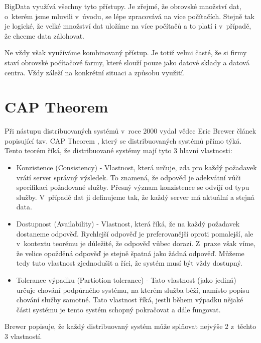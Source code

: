 BigData využívá všechny tyto přístupy. Je zřejmé, že obrovské množství dat, o~kterém jsme mluvili v~úvodu, se lépe zpracovává na více počítačích. Stejně tak je logické, že velké množství dat uložíme na více počítačů a to platí i v~případě, že chceme data zálohovat. 

Ne vždy však využíváme kombinovaný přístup. Je totiž velmi časté, že si firmy staví obrovské počítačové farmy, které slouží pouze jako datové sklady a datová centra. Vždy záleží na konkrétní situaci a způsobu využití. 


\section{CAP Theorem}
 Při nástupu distribuovaných systémů v~roce 2000 vydal vědec Eric Brewer článek popisující tzv. CAP Theorem \cite{cap}, který se distribuovaných systémů přímo týká. Tento teorém říká, že distribuované systémy mají tyto 3 hlavní vlastnosti: 

\begin{itemize}
\item Konzistence (Consistency) - Vlastnost, která určuje, zda pro každý požadavek vrátí server správný výsledek. To znamená, že odpověď je adekvátní vůči specifikaci požadované služby. Přesný význam konzistence se odvíjí od typu služby. V~případě dat ji definujeme tak, že každý server má aktuální a stejná data.

\item Dostupnost (Availability) - Vlastnost, která říká, že na každý požadavek dostaneme odpověď. Rychlejší odpověď je preferovanější oproti pomalejší, ale v~kontextu teorému je důležité, že odpověď vůbec dorazí. Z~praxe však víme, že velice opožděná odpověď je stejně špatná jako žádná odpověď. Můžeme tedy tuto vlastnost zjednodušit a říci, že systém musí být vždy dostupný.

\item Tolerance výpadku (Partiotion tolerance) - Tato vlastnost (jako jediná) určuje chování podpůrného systému, na kterém služba běží, namísto popisu chování služby samotné. Tato vlastnost říká, jestli během výpadku nějaké části systému je tento systém schopný pokračovat a dále fungovat.

\end{itemize}


Brewer popisuje, že každý distribuovaný systém může splňovat nejvýše 2 z~těchto 3 vlastností.

